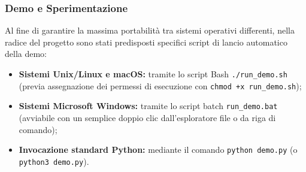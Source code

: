 \subsubsection{Demo e Sperimentazione}
Al fine di garantire la massima portabilità tra sistemi operativi differenti, nella radice del progetto sono stati predisposti specifici script di lancio automatico della demo:
\begin{itemize}
	\item \textbf{Sistemi Unix/Linux e macOS:} tramite lo script Bash \texttt{./run\_demo.sh} (previa assegnazione dei permessi di esecuzione con \texttt{chmod +x run\_demo.sh});
	\item \textbf{Sistemi Microsoft Windows:} tramite lo script batch \texttt{run\_demo.bat} (avviabile con un semplice doppio clic dall'esploratore file o da riga di comando);
	\item \textbf{Invocazione standard Python:} mediante il comando \texttt{python demo.py} (o \texttt{python3 demo.py}).
\end{itemize}

